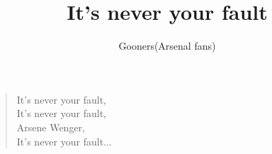 \documentclass[a4paper,12pt]{article}
\title{It's never your fault}
\author{Gooners(Arsenal fans)}
\date{}
\begin{document}
	
	\maketitle
	
	\begin{verse}
		
		It's never your fault, \\
		It's never your fault, \\
		Arsene Wenger, \\
		It's never your fault$\ldots$
		
	\end{verse}
	
\end{document}
